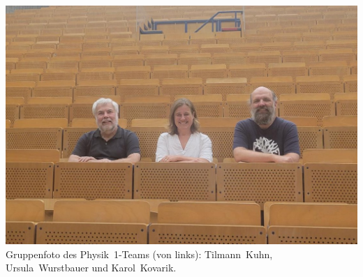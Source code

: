 \vfill

\begin{center}
\includegraphics[width=\columnwidth, height=0.35\textheight]{res/ProfsWS2025_cut.jpg}\\
\smallskip
Gruppenfoto des Physik~1-Teams (von links): Tilmann~Kuhn, Ursula~Wurstbauer und Karol~Kovarik.
\end{center}










\newpage

